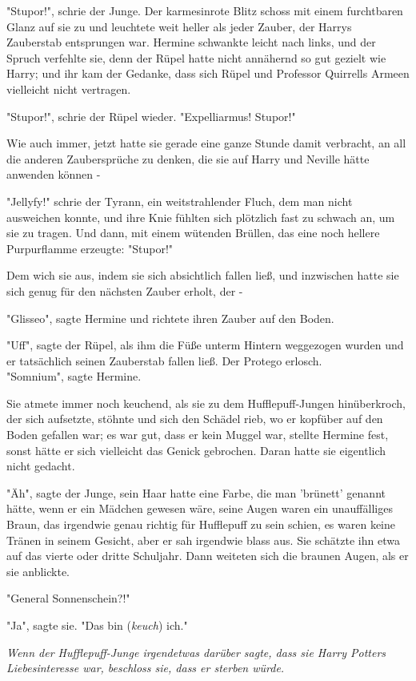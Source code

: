 {"Stupor!", schrie der Junge. Der karmesinrote Blitz schoss mit einem furchtbaren Glanz auf sie zu und leuchtete weit heller als jeder Zauber, der Harrys Zauberstab entsprungen war. Hermine schwankte leicht nach links, und der Spruch verfehlte sie, denn der Rüpel hatte nicht annähernd so gut gezielt wie Harry; und ihr kam der Gedanke, dass sich Rüpel und Professor Quirrells Armeen vielleicht nicht vertragen.

"Stupor!", schrie der Rüpel wieder. "Expelliarmus! Stupor!"

Wie auch immer, jetzt hatte sie gerade eine ganze Stunde damit verbracht, an all die anderen Zaubersprüche zu denken, die sie auf Harry und Neville hätte anwenden können -

"Jellyfy!" schrie der Tyrann, ein weitstrahlender Fluch, dem man nicht ausweichen konnte, und ihre Knie fühlten sich plötzlich fast zu schwach an, um sie zu tragen. Und dann, mit einem wütenden Brüllen, das eine noch hellere Purpurflamme erzeugte: "Stupor!"

Dem wich sie aus, indem sie sich absichtlich fallen ließ, und inzwischen hatte sie sich genug für den nächsten Zauber erholt, der -

"Glisseo", sagte Hermine und richtete ihren Zauber auf den Boden.

"Uff", sagte der Rüpel, als ihm die Füße unterm Hintern weggezogen wurden und er tatsächlich seinen Zauberstab fallen ließ. Der Protego erlosch.\\ "Somnium", sagte Hermine.

Sie atmete immer noch keuchend, als sie zu dem Hufflepuff-Jungen hinüberkroch, der sich aufsetzte, stöhnte und sich den Schädel rieb, wo er kopfüber auf den Boden gefallen war; es war gut, dass er kein Muggel war, stellte Hermine fest, sonst hätte er sich vielleicht das Genick gebrochen. Daran hatte sie eigentlich nicht gedacht.

"Äh", sagte der Junge, sein Haar hatte eine Farbe, die man 'brünett' genannt hätte, wenn er ein Mädchen gewesen wäre, seine Augen waren ein unauffälliges Braun, das irgendwie genau richtig für Hufflepuff zu sein schien, es waren keine Tränen in seinem Gesicht, aber er sah irgendwie blass aus. Sie schätzte ihn etwa auf das vierte oder dritte Schuljahr. Dann weiteten sich die braunen Augen, als er sie anblickte.

"General Sonnenschein?!"

"Ja", sagte sie. "Das bin (\emph{keuch}) ich."

\emph{Wenn der Hufflepuff-Junge irgendetwas darüber sagte, dass sie Harry Potters Liebesinteresse war, beschloss sie, dass er sterben würde.}

}
